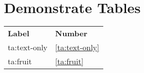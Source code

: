 %
%
%

\chapter{Demonstrate Tables}

\begin{tabular}{ll}
    \bf Label& \bf Number\\
    ta:text-only& \ref{ta:text-only}\\
    ta:fruit&     \ref{ta:fruit}
\end{tabular}

\newlength{\ta}
\newlength{\tb}
\newlength{\tc}


